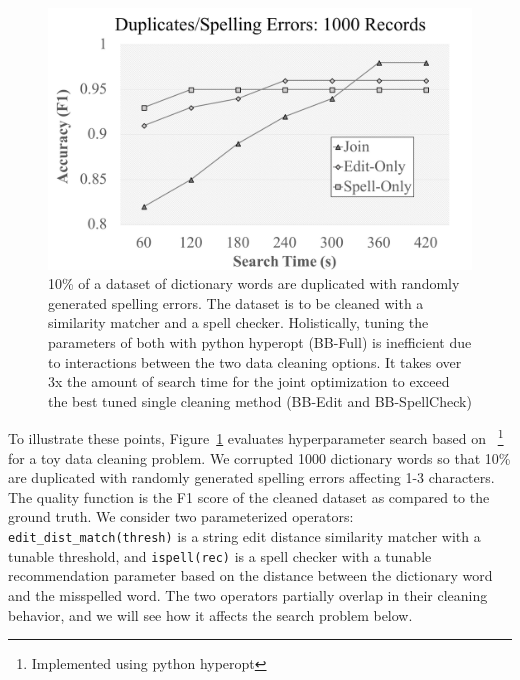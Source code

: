 \begin{figure}[t]
\centering
 \includegraphics[width=0.9\columnwidth]{figures/teaser-experiment.png}
 \caption{\small 10\% of a dataset of dictionary words are duplicated with randomly generated spelling errors. The dataset is to be cleaned with a similarity matcher and a spell checker. Holistically, tuning the parameters of both with \textsf{python hyperopt} (BB-Full) is inefficient due to interactions between the two data cleaning options. It takes over 3x the amount of search time for the joint optimization to exceed the best tuned single cleaning method (BB-Edit and BB-SpellCheck) \label{fig:teaser}}
\end{figure}

To illustrate these points, Figure~\ref{fig:teaser} evaluates hyperparameter search based on ~\cite{}\footnote{Implemented using \textsf{python hyperopt}} for a toy data cleaning problem.  We corrupted 1000 dictionary words so that 10\% are duplicated with randomly generated spelling errors affecting 1-3 characters. The quality function is the F1 score of the cleaned dataset as compared to the ground truth.  We consider two parameterized operators: \texttt{edit\_dist\_match(thresh)} is a string edit distance similarity matcher with a tunable threshold, and \texttt{ispell(rec)} is a spell checker with a tunable recommendation parameter based on the distance between the dictionary word and the misspelled word.  The two operators partially overlap in their cleaning behavior, and we will see how it affects the search problem below.   

